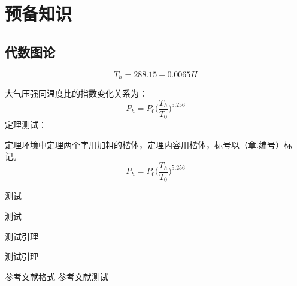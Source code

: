 \chapter{预备知识}
\section{代数图论}

\begin{equation}
T_h=288.15-0.0065H
\end{equation}

大气压强同温度比的指数变化关系为：
\begin{equation}
P_h=P_0\big(\frac{T_h}{T_0}\big)^{5.256}
\end{equation}
定理测试：
\begin{Theorem}
定理环境中定理两个字用加粗的楷体，定理内容用楷体，标号以（章.编号）标记。
\begin{equation}
P_h=P_0\big(\frac{T_h}{T_0}\big)^{5.256}
\end{equation}
\end{Theorem}
\begin{Theorem}
测试
\end{Theorem}
\begin{Theorem}
测试
\end{Theorem}
\begin{Lemma}
测试引理
\end{Lemma}
\begin{Lemma}
测试引理
\end{Lemma}
参考文献格式
参考文献测试